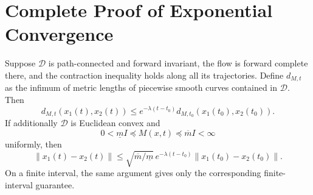 \section{Complete Proof of Exponential Convergence}

\begin{theorem}
\label{thm:ch4:convergence}
Suppose $\mathcal D$ is path-connected and forward invariant, the flow is forward complete there, and the contraction inequality holds along all its trajectories. Define $d_{M,t}$ as the infimum of metric lengths of piecewise smooth curves contained in $\mathcal D$. Then
\begin{equation}
d_{M,t}(x_1(t),x_2(t))\leq e^{-\lambda(t-t_0)}
d_{M,t_0}(x_1(t_0),x_2(t_0)).
\label{eq:ch4:geodesic-decay}
\end{equation}
If additionally $\mathcal D$ is Euclidean convex and
\begin{equation}
0<\underline m I\preceq M(x,t)\preceq\overline m I<\infty
\label{eq:ch4:metric-bounds}
\end{equation}
uniformly, then
\begin{equation}
\|x_1(t)-x_2(t)\|\leq\sqrt{\overline m/\underline m}\,
e^{-\lambda(t-t_0)}\|x_1(t_0)-x_2(t_0)\|.
\label{eq:ch4:euclidean-decay}
\end{equation}
On a finite interval, the same argument gives only the corresponding finite-interval guarantee.
\end{theorem}

